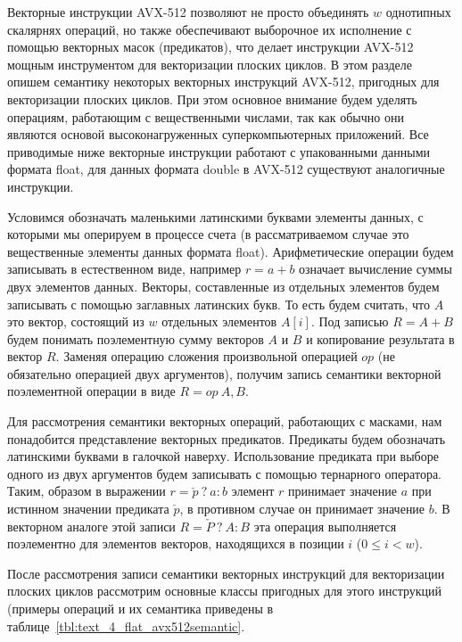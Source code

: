 Векторные инструкции AVX-512\label{abbr:avx-9} позволяют не просто объединять $w$ однотипных скалярнях операций, но также обеспечивают выборочное их исполнение с помощью векторных масок (предикатов), что делает инструкции AVX-512 мощным инструментом для векторизации плоских циклов.
В этом разделе опишем семантику некоторых векторных инструкций AVX-512, пригодных для векторизации плоских циклов.
При этом основное внимание будем уделять операциям, работающим с вещественными числами, так как обычно они являются основой высоконагруженных суперкомпьютерных приложений.
Все приводимые ниже векторные инструкции работают с упакованными данными формата float, для данных формата double в AVX-512 существуют аналогичные инструкции.

Условимся обозначать маленькими латинскими буквами элементы данных, с которыми мы оперируем в процессе счета (в рассматриваемом случае это вещественные элементы данных формата float).
Арифметические операции будем записывать в естественном виде, например $r = a + b$ означает вычисление суммы двух элементов данных.
Векторы, составленные из отдельных элементов будем записывать с помощью заглавных латинских букв.
То есть будем считать, что $A$ это вектор, состоящий из $w$ отдельных элементов $A[i]$.
Под записью $R = A + B$ будем понимать поэлементную сумму векторов $A$ и $B$ и копирование результата в вектор $R$.
Заменяя операцию сложения произвольной операцией $op$ (не обязательно операцией двух аргументов), получим запись семантики векторной поэлементной операции в виде $R = op \ A, B$.

Для рассмотрения семантики векторных операций, работающих с масками, нам понадобится представление векторных предикатов.
Предикаты будем обозначать латинскими буквами в галочкой наверху.
Использование предиката при выборе одного из двух аргументов будем записывать с помощью тернарного оператора.
Таким, образом в выражении $r = \check{p} \ ? \ a : b$ элемент $r$ принимает значение $a$ при истинном значении предиката $\check{p}$, в противном случае он принимает значение $b$.
В векторном аналоге этой записи $R = \check{P} \ ? \ A : B$ эта операция выполняется поэлементно для элементов векторов, находящихся в позиции $i$ ($0 \le i < w$).

После рассмотрения записи семантики векторных инструкций для векторизации плоских циклов рассмотрим основные классы пригодных для этого инструкций (примеры операций и их семантика приведены в таблице~\ref{tbl:text_4_flat_avx512semantic}.

